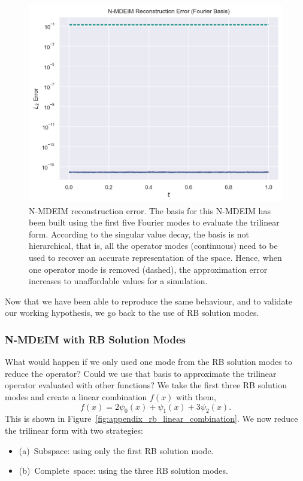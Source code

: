 \documentclass[../../thesis.tex]{subfiles}
\begin{document}
\begin{figure}[h]
    \includegraphics[width=\columnwidth]{research_project/piston/figures/svd_fourier/fourier_basis_mdeim_truncation_errors_comparison.png}
    \caption{N-MDEIM reconstruction error.
    The basis for this N-MDEIM has been built using 
    the first five Fourier modes to evaluate the trilinear form.
    According to the singular value decay, the basis is not hierarchical, 
    that is, all the operator modes (continuous) need to be used to 
    recover an accurate representation of the space.
    Hence, when one operator mode is removed (dashed), 
    the approximation error increases to unaffordable values for a simulation.}
    \label{fig:appendix_fourier_nmdeim_reconstruction_error}
\end{figure}
Now that we have been able to reproduce the same behaviour, 
and to validate our working hypothesis,
we go back to the use of RB solution modes.

\newpage
\subsubsection{N-MDEIM with RB Solution Modes}
\label{sec:nmdeim_one_mode}
What would happen if we only used one mode from the RB solution modes to reduce the operator?
Could we use that basis to approximate the trilinear operator evaluated with other functions?
We take the first three RB solution modes 
and create a linear combination $f(x)$ with them,
\begin{equation}
    f(x) = 2 \psi_0(x) + \psi_1(x) + 3 \psi_2(x).
\end{equation} 
This is shown in Figure~\ref{fig:appendix_rb_linear_combination}.
We now reduce the trilinear form with two strategies:
\begin{itemize}
    \item \mbox{(a) Subspace}: using only the first RB solution mode.
    \item \mbox{(b) Complete space}: using the three RB solution modes.
\end{itemize}
\end{document}
